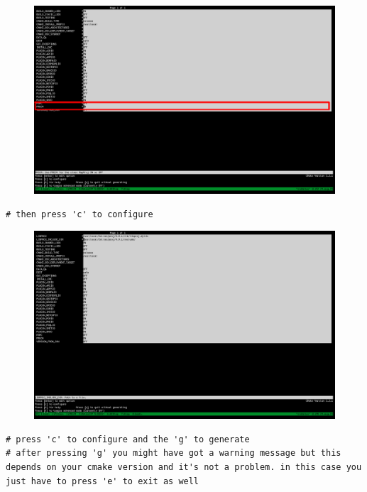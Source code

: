 \begin{itemize}
\begin{figure}[h]
  \includegraphics[width=\linewidth]{2015/Aug/24/3pic.png}
\end{figure}

\pagebreak

\begin{lstlisting}[style=bashStyle]
# then press 'c' to configure
\end{lstlisting}

\begin{figure}[h]
\includegraphics[width=\linewidth]{2015/Aug/24/7pic.png}
\end{figure}

\pagebreak

\begin{lstlisting}[style=bashStyle]
# press 'c' to configure and the 'g' to generate
# after pressing 'g' you might have got a warning message but this depends on your cmake version and it's not a problem. in this case you just have to press 'e' to exit as well
\end{lstlisting}


\end{itemize}
